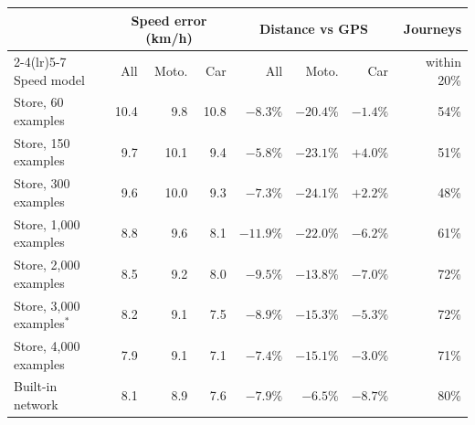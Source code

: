 \begin{tabular}{lrrrrrrr}
\toprule
 & \multicolumn{3}{c}{Speed error (km/h)} & \multicolumn{3}{c}{Distance vs GPS} & Journeys\\
\cmidrule(lr){2-4}\cmidrule(lr){5-7}
Speed model & All & Moto. & Car & All & Moto. & Car & within 20\%\\
\midrule
Store, 60 examples & 10.4 & 9.8 & 10.8 & $-8.3\%$ & $-20.4\%$ & $-1.4\%$ & 54\% \\
Store, 150 examples & 9.7 & 10.1 & 9.4 & $-5.8\%$ & $-23.1\%$ & $+4.0\%$ & 51\% \\
Store, 300 examples & 9.6 & 10.0 & 9.3 & $-7.3\%$ & $-24.1\%$ & $+2.2\%$ & 48\% \\
Store, 1{,}000 examples & 8.8 & 9.6 & 8.1 & $-11.9\%$ & $-22.0\%$ & $-6.2\%$ & 61\% \\
Store, 2{,}000 examples & 8.5 & 9.2 & 8.0 & $-9.5\%$ & $-13.8\%$ & $-7.0\%$ & 72\% \\
Store, 3{,}000 examples$^\ast$ & 8.2 & 9.1 & 7.5 & $-8.9\%$ & $-15.3\%$ & $-5.3\%$ & 72\% \\
Store, 4{,}000 examples & 7.9 & 9.1 & 7.1 & $-7.4\%$ & $-15.1\%$ & $-3.0\%$ & 71\% \\
\midrule
Built-in network & 8.1 & 8.9 & 7.6 & $-7.9\%$ & $-6.5\%$ & $-8.7\%$ & 80\% \\
\bottomrule
\end{tabular}
